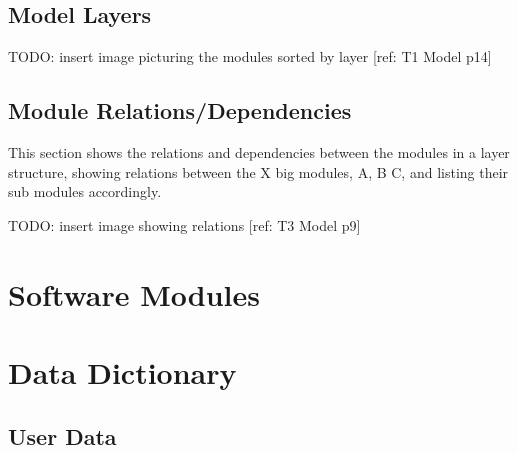 \documentclass[11pt,a4paper,oneside,svgnames]{report}
\begin{document}
\section{Model Layers}
TODO: insert image picturing the modules sorted by layer [ref: T1 Model p14]

\section{Module Relations/Dependencies}
This section shows the relations and dependencies between the modules in a layer structure, showing relations between the X big modules, A, B C, and listing their sub modules accordingly.

TODO: insert image showing relations [ref: T3 Model p9]

\chapter{Software Modules}


\chapter{Data Dictionary}

\section{User Data}
\end{document}
